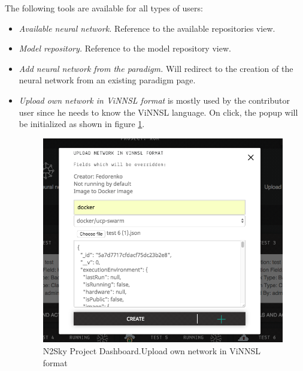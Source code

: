 The following tools are available for all types of users:
\begin{itemize}
\item \emph{Available neural network.} Reference to the available repositories view.  
\item \emph{Model repository.} Reference to the model repository view.
\item \emph{Add neural network from the paradigm.} Will redirect to the creation of the neural network from an existing paradigm page. 
\item \emph{Upload own network in ViNNSL format} is mostly used by the contributor user since he needs to know the ViNNSL language. On click, the popup will be initialized as shown in figure \ref{fig:upload_vinnsl_popup}. 

\begin{figure}[htbp]
\begin{center}
  \includegraphics[scale=0.5]{components/5/img/upload_vinnsl_popup.png}
  \caption{N2Sky Project Dashboard.Upload own network in ViNNSL format}
  \label{fig:upload_vinnsl_popup}
\end{center}
\end{figure}


\end{itemize}
